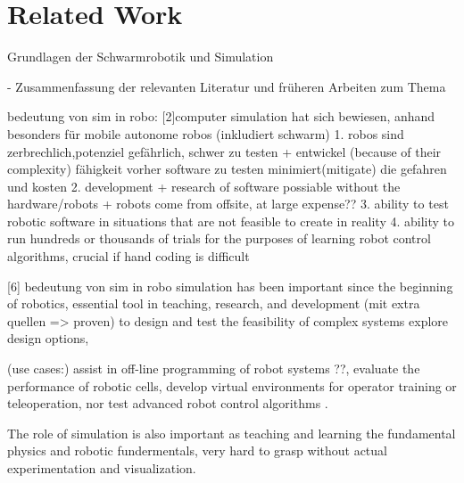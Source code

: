 \documentclass[german,version-2020-11]{uzl-thesis}
\begin{document}
\section{Related Work}

%

Grundlagen der Schwarmrobotik und Simulation 

- Zusammenfassung der relevanten Literatur und früheren Arbeiten zum Thema

    
  bedeutung von sim in robo:
	[2]computer simulation hat sich bewiesen, anhand
		besonders für mobile autonome robos (inkludiert schwarm)
		1. robos sind zerbrechlich,potenziel gefährlich, schwer zu testen + entwickel (because of their complexity)
		fähigkeit vorher software zu testen minimiert(mitigate) die gefahren und kosten
		2. development + research of software possiable without the hardware/robots
			+ robots come from offsite, at large expense??
		3. ability to test robotic software in situations that are not feasible to create in reality
		4. ability to run hundreds or thousands of trials for the purposes of learning robot control algorithms, crucial if hand coding is difficult
	
	[6] bedeutung von sim in robo
      simulation has been important since the beginning of robotics,
      essential tool in teaching, research, and development  (mit extra quellen => proven)
      to design and test the feasibility of complex systems
      explore design options, 
      
      (use cases:)
      assist in off-line programming of robot systems ??,
       evaluate the performance of robotic cells,
      develop virtual environments for operator training or teleoperation, 
      nor test advanced robot control algorithms .
      
      The role of simulation is also important as teaching and learning the fundamental physics and robotic fundermentals, very hard to grasp without actual experimentation and visualization. 
      
\end{document}
